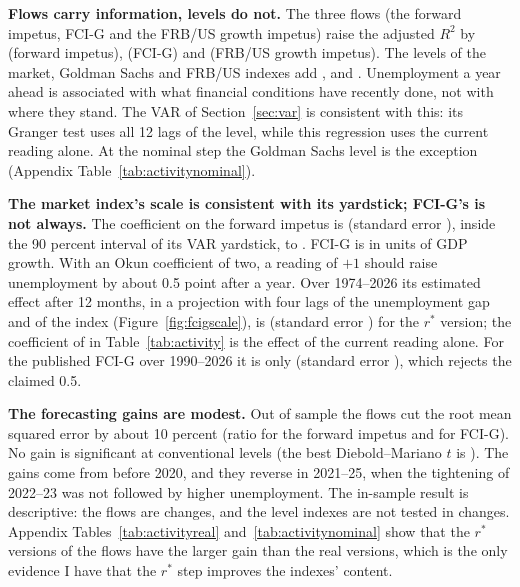 \documentclass[11pt]{article}
\newcommand{\rs}{r^{*}}
\begin{document}


\textbf{Flows carry information, levels do not.} The three flows (the forward impetus, FCI-G and the FRB/US growth impetus) raise the adjusted $R^2$ by  (forward impetus),  (FCI-G) and  (FRB/US growth impetus). The levels of the market, Goldman Sachs and FRB/US indexes add ,  and . Unemployment a year ahead is associated with what financial conditions have recently done, not with where they stand. The VAR of Section~\ref{sec:var} is consistent with this: its Granger test uses all 12 lags of the level, while this regression uses the current reading alone. At the nominal step the Goldman Sachs level is the exception (Appendix Table~\ref{tab:activitynominal}).

\textbf{The market index's scale is consistent with its yardstick; FCI-G's is not always.} The coefficient on the forward impetus is  (standard error ), inside the 90 percent interval of its VAR yardstick,  to . FCI-G is in units of GDP growth. With an Okun coefficient of two, a reading of $+1$ should raise unemployment by about 0.5 point after a year. Over 1974--2026 its estimated effect after 12 months, in a projection with four lags of the unemployment gap and of the index (Figure~\ref{fig:fcigscale}), is  (standard error ) for the $\rs$ version; the coefficient of  in Table~\ref{tab:activity} is the effect of the current reading alone. For the published FCI-G over 1990--2026 it is only  (standard error ), which rejects the claimed 0.5.

\textbf{The forecasting gains are modest.} Out of sample the flows cut the root mean squared error by about 10 percent (ratio  for the forward impetus and  for FCI-G). No gain is significant at conventional levels (the best Diebold--Mariano $t$ is ). The gains come from before 2020, and they reverse in 2021--25, when the tightening of 2022--23 was not followed by higher unemployment. The in-sample result is descriptive: the flows are changes, and the level indexes are not tested in changes. Appendix Tables~\ref{tab:activityreal} and~\ref{tab:activitynominal} show that the $\rs$ versions of the flows have the larger gain than the real versions, which is the only evidence I have that the $\rs$ step improves the indexes' content.
\end{document}
